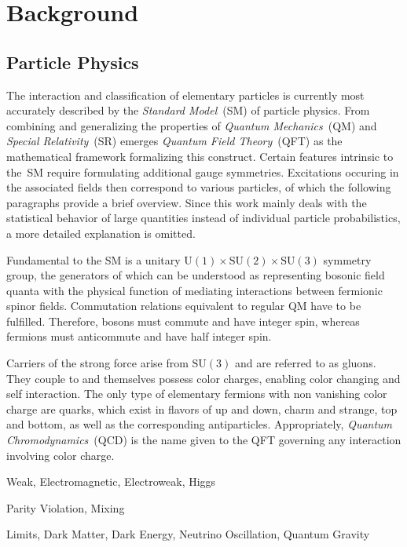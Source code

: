 \chapter{Background}
\label{ch:background}



\section{Particle Physics}
\label{sec:particle}

The interaction and classification of elementary particles is currently most accurately described by the \emph{Standard Model}~(SM)
of particle physics. From combining and generalizing the properties of \emph{Quantum Mechanics}~(QM) and \emph{Special Relativity}~(SR)
emerges \emph{Quantum Field Theory}~(QFT) as the mathematical framework formalizing this construct. Certain features intrinsic to the~SM
require formulating additional gauge symmetries. Excitations occuring in the associated fields then correspond to
various particles, of which the following paragraphs provide a brief overview. Since this work mainly deals with the statistical behavior
of large quantities instead of individual particle probabilistics, a more detailed explanation is omitted.

Fundamental to the SM is a unitary $\text{U}(1) \times \text{SU}(2) \times \text{SU}(3)$ symmetry group, the generators of which can be
understood as representing bosonic field quanta with the physical function of mediating interactions between fermionic spinor fields.
Commutation relations equivalent to regular QM have to be fulfilled. Therefore, bosons must commute and have integer spin, whereas
fermions must anticommute and have half integer spin.

Carriers of the strong force arise from $\text{SU}(3)$ and are referred to as gluons. They couple to and themselves possess color
charges, enabling color changing and self interaction. The only type of elementary fermions with non vanishing color charge are quarks,
which exist in flavors of up and down, charm and strange, top and bottom, as well as the corresponding antiparticles. Appropriately,
\emph{Quantum Chromodynamics}~(QCD) is the name given to the QFT governing any interaction involving color charge.

\newpage

Weak, Electromagnetic, Electroweak, Higgs

Parity Violation, Mixing

Limits, Dark Matter, Dark Energy, Neutrino Oscillation, Quantum Gravity

